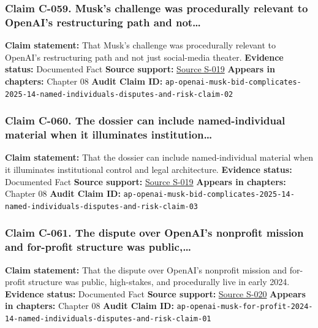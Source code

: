 \documentclass[
  american,
  11pt,
  letterpaper,
]{article}
\begin{document}
\subsubsection{Claim C-059. Musk's challenge was procedurally relevant
to OpenAI's restructuring path and
not\ldots{}}\label{claim-c-059-musk-s-challenge-was-procedurally-relevant-to-openai-s-restructuring-path-and-not}

\textbf{Claim statement:} That Musk's challenge was procedurally
relevant to OpenAI's restructuring path and not just social-media
theater. \textbf{Evidence status:} Documented Fact \textbf{Source
support:}
\hyperref[source-s-019-how-elon-musk-97-4-billion-bid-complicates-matters-for-openai]{Source
S-019} \textbf{Appears in chapters:} Chapter 08 \textbf{Audit Claim ID:}
\texttt{ap-openai-musk-bid-complicates-2025-14-named-individuals-disputes-and-risk-claim-02}

\subsubsection{Claim C-060. The dossier can include named-individual
material when it illuminates
institution\ldots{}}\label{claim-c-060-the-dossier-can-include-named-individual-material-when-it-illuminates-institution}

\textbf{Claim statement:} That the dossier can include named-individual
material when it illuminates institutional control and legal
architecture. \textbf{Evidence status:} Documented Fact \textbf{Source
support:}
\hyperref[source-s-019-how-elon-musk-97-4-billion-bid-complicates-matters-for-openai]{Source
S-019} \textbf{Appears in chapters:} Chapter 08 \textbf{Audit Claim ID:}
\texttt{ap-openai-musk-bid-complicates-2025-14-named-individuals-disputes-and-risk-claim-03}

\subsubsection{Claim C-061. The dispute over OpenAI's nonprofit mission
and for-profit structure was
public,\ldots{}}\label{claim-c-061-the-dispute-over-openai-s-nonprofit-mission-and-for-profit-structure-was-public}

\textbf{Claim statement:} That the dispute over OpenAI's nonprofit
mission and for-profit structure was public, high-stakes, and
procedurally live in early 2024. \textbf{Evidence status:} Documented
Fact \textbf{Source support:}
\hyperref[source-s-020-openai-says-musk-agreed-the-chatgpt-maker-should-become-a-for-profit-company]{Source
S-020} \textbf{Appears in chapters:} Chapter 08 \textbf{Audit Claim ID:}
\texttt{ap-openai-musk-for-profit-2024-14-named-individuals-disputes-and-risk-claim-01}
\end{document}
